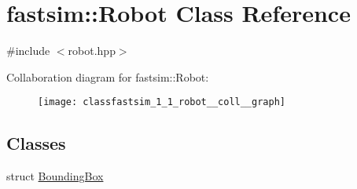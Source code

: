 \hypertarget{classfastsim_1_1_robot}{}\section{fastsim\+:\+:Robot Class Reference}
\label{classfastsim_1_1_robot}


{\ttfamily \#include $<$robot.\+hpp$>$}



Collaboration diagram for fastsim\+:\+:Robot\+:
\nopagebreak
\begin{figure}[H]
\begin{center}
\leavevmode
\texttt{[image: classfastsim\_1\_1\_robot\_\_coll\_\_graph]}
\end{center}
\end{figure}
\subsection*{Classes}
\begin{DoxyCompactItemize}
\item 
struct \hyperlink{structfastsim_1_1_robot_1_1_bounding_box}{Bounding\+Box}
\end{DoxyCompactItemize}
